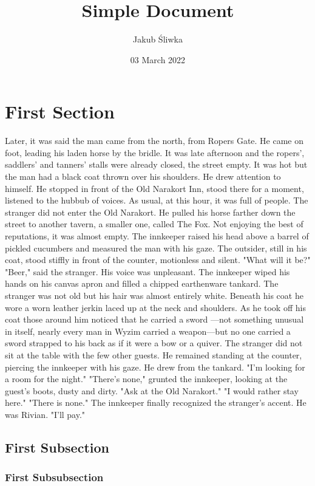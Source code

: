 \documentclass{article}
\title{Simple Document}
\author{Jakub Śliwka}
\date{03 March 2022}
\begin{document}
\maketitle

\section{First Section}

Later, it was said the man came from the north, from Ropers Gate. He came
on foot, leading his laden horse by the bridle. It was late afternoon and the
ropers’, saddlers’ and tanners’ stalls were already closed, the street empty. It
was hot but the man had a black coat thrown over his shoulders. He drew
attention to himself.
He stopped in front of the Old Narakort Inn, stood there for a moment,
listened to the hubbub of voices. As usual, at this hour, it was full of people.
The stranger did not enter the Old Narakort. He pulled his horse farther
down the street to another tavern, a smaller one, called The Fox. Not
enjoying the best of reputations, it was almost empty.
The innkeeper raised his head above a barrel of pickled cucumbers and
measured the man with his gaze. The outsider, still in his coat, stood stiffly
in front of the counter, motionless and silent.
"What will it be?"
"Beer," said the stranger. His voice was unpleasant.
The innkeeper wiped his hands on his canvas apron and filled a chipped
earthenware tankard.
The stranger was not old but his hair was almost entirely white. Beneath
his coat he wore a worn leather jerkin laced up at the neck and shoulders.
As he took off his coat those around him noticed that he carried a sword
—not something unusual in itself, nearly every man in Wyzim carried a
weapon—but no one carried a sword strapped to his back as if it were a
bow or a quiver.
The stranger did not sit at the table with the few other guests. He
remained standing at the counter, piercing the innkeeper with his gaze. He
drew from the tankard.
"I’m looking for a room for the night."
"There's none," grunted the innkeeper, looking at the guest's boots, dusty
and dirty. "Ask at the Old Narakort."
"I would rather stay here."
"There is none." The innkeeper finally recognized the stranger's accent.
He was Rivian.
"I’ll pay." 

\subsection{First Subsection}
\subsubsection{First Subsubsection}
\end{document}
